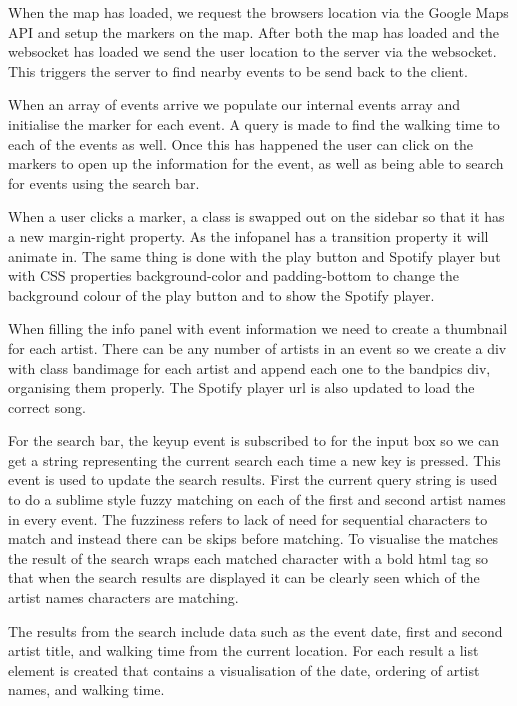 \documentclass[10pt]{article}
\begin{document}
            When the map has loaded, we request the browsers location via the Google Maps API and setup the markers on the map. After both the map has loaded and the websocket has loaded we send the user location to the server via the websocket. This triggers the server to find nearby events to be send back to the client.

            When an array of events arrive we populate our internal events array and initialise the marker for each event. A query is made to find the walking time to each of the events as well. Once this has happened the user can click on the markers to open up the information for the event, as well as being able to search for events using the search bar.

            When a user clicks a marker, a class is swapped out on the sidebar so that it has a new margin-right property. As the infopanel has a transition property it will animate in. The same thing is done with the play button and Spotify player but with CSS properties background-color and padding-bottom to change the background colour of the play button and to show the Spotify player.

            When filling the info panel with event information we need to create a thumbnail for each artist. There can be any number of artists in an event so we create a div with class bandimage for each artist and append each one to the bandpics div, organising them properly. The Spotify player url is also updated to load the correct song.

            For the search bar, the keyup event is subscribed to for the input box so we can get a string representing the current search each time a new key is pressed. This event is used to update the search results. First the current query string is used to do a sublime style fuzzy matching on each of the first and second artist names in every event. The fuzziness refers to lack of need for sequential characters to match and instead there can be skips before matching. To visualise the matches the result of the search wraps each matched character with a bold html tag so that when the search results are displayed it can be clearly seen which of the artist names characters are matching.

            The results from the search include data such as the event date, first and second artist title, and walking time from the current location. For each result a list element is created that contains a visualisation of the date, ordering of artist names, and walking time.
\end{document}
